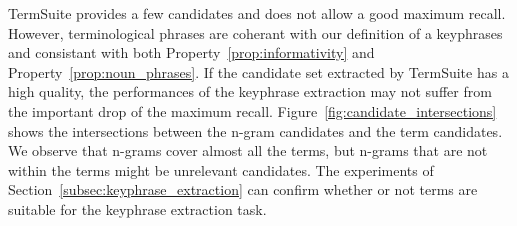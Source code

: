       TermSuite provides a few candidates and does not allow a good maximum
      recall. However, terminological phrases are coherant with our definition
      of a keyphrases and consistant with both Property~\ref{prop:informativity}
      and Property~\ref{prop:noun_phrases}. If the candidate set extracted by
      TermSuite has a high quality, the performances of the keyphrase extraction
      may not suffer from the important drop of the maximum recall.
      Figure~\ref{fig:candidate_intersections} shows the intersections between
      the n-gram candidates and the term candidates. We observe that n-grams
      cover almost all the terms, but n-grams that are not within the terms
      might be unrelevant candidates. The experiments of
      Section~\ref{subsec:keyphrase_extraction} can confirm whether or not terms
      are suitable for the keyphrase extraction task.
